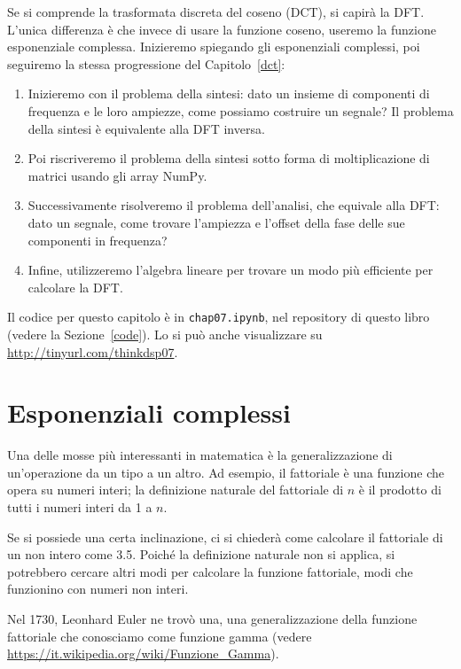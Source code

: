 \documentclass[12pt,a4paper]{book}
\begin{document}
Se si comprende la trasformata discreta del coseno (DCT), si capirà la DFT. L'unica differenza è che invece di usare la funzione coseno, useremo la funzione esponenziale complessa. Inizieremo spiegando gli esponenziali complessi, poi seguiremo la stessa progressione del Capitolo~\ref{dct}:

\begin{enumerate} 

\item Inizieremo con il problema della sintesi: dato un insieme di componenti di frequenza e le loro ampiezze, come possiamo costruire un segnale? Il problema della sintesi è equivalente alla DFT inversa.

\item Poi riscriveremo il problema della sintesi sotto forma di moltiplicazione di matrici usando gli array NumPy.

\item Successivamente risolveremo il problema dell'analisi, che equivale alla DFT: dato un segnale, come trovare l'ampiezza e l'offset della fase delle sue componenti in frequenza?

\item Infine, utilizzeremo l'algebra lineare per trovare un modo più efficiente per calcolare la DFT.

\end{enumerate} 

Il codice per questo capitolo è in {\tt chap07.ipynb}, nel repository di questo libro (vedere la Sezione~\ref{code}). Lo si può anche visualizzare su \url{http://tinyurl.com/thinkdsp07}.

\section{Esponenziali complessi} 

Una delle mosse più interessanti in matematica è la generalizzazione di un'operazione da un tipo a un altro. Ad esempio, il fattoriale è una funzione che opera su numeri interi; la definizione naturale del fattoriale di $n$ è il prodotto di tutti i numeri interi da 1 a $n$.

Se si possiede una certa inclinazione, ci si chiederà come calcolare il fattoriale di un non intero come 3.5. Poiché la definizione naturale non si applica, si potrebbero cercare altri modi per calcolare la funzione fattoriale, modi che funzionino con numeri non interi.

Nel 1730, Leonhard Euler ne trovò una, una generalizzazione della funzione fattoriale che conosciamo come funzione gamma (vedere \url{https://it.wikipedia.org/wiki/Funzione_Gamma}).
\end{document}
